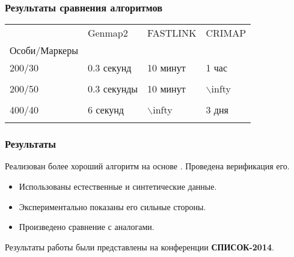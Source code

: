 \documentclass{beamer}
\begin{document}
\begin{frame}
  \frametitle{Результаты сравнения алгоритмов}

  \begin{tabular}{|l|l|l|l|}
    \hline
    & Genmap2 & FASTLINK & CRIMAP \\
    Особи/Маркеры & & & \\
    \hline
    200/30 & 0.3 секунд & 10 минут & 1 час \\
    & & & \\
    \hline
    200/50 & 0.3 секунды & 10 минут & $\backslash$infty \\
    & & & \\
    \hline
    400/40 & 6 секунд & $\backslash$infty & 3 дня \\
    & & & \\
    \hline
  \end{tabular}
\end{frame}

\begin{frame}
  \frametitle{Результаты}
  Реализован более хороший алгоритм на основе \genmap. Проведена
  верификация его.
  \begin{itemize}
  \item Использованы естественные и синтетические данные.
  \item Экспериментально показаны его сильные стороны.
  \item Произведено сравнение с аналогами.
  \end{itemize}

  \bigskip

  Результаты работы были представлены на конференции
  \textbf{СПИСОК-2014}.
\end{frame}
\end{document}
